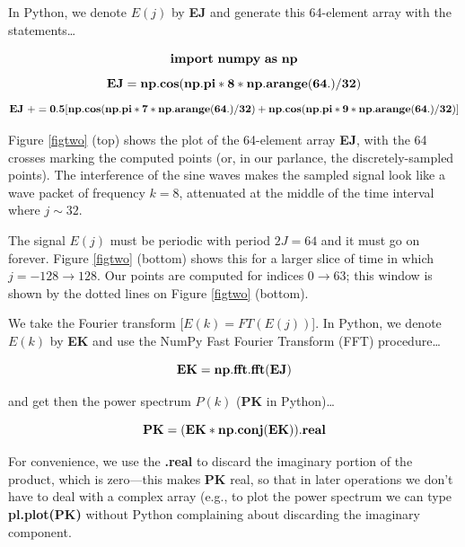\documentclass[11pt,preprint]{aastex}
\begin{document}
 In Python, we denote $E(j)$ by {\bf EJ} and generate this
64-element array with the statements\dots

\begin{mathletters} \begin{equation} \bf{ import~numpy~as~np} \end{equation}
 \begin{equation}
 \bf{ EJ = np.cos(np.pi * 8 * np.arange(64.)/32) }
\end{equation} \begin{equation} \bf{ EJ~+= 0.5[np.cos(np.pi * 7
* np.arange(64.)/32) + np.cos(np.pi * 9 * np.arange(64.)/32) ] }
\end{equation}
\end{mathletters}

\noindent Figure \ref{figtwo} (top) shows the plot of the 64-element
array {\bf EJ}, with the 64 crosses marking the computed points (or, in
our parlance, the discretely-sampled points).  The interference of the
sine waves makes the sampled signal look like a wave packet of frequency
$k=8$, attenuated at the middle of the time interval where $j \sim 32$. 

	The signal $E(j)$ must be periodic with period $2J = 64$ and it
must go on forever.  Figure \ref{figtwo} (bottom) shows this for a
larger slice of time in which $j = -128 \rightarrow 128$.  Our points
are computed for indices $0 \rightarrow 63$; this window is shown by
the dotted lines on Figure \ref{figtwo} (bottom). 

 We take the Fourier transform [$E(k) = FT( E(j))$].  In Python, we
denote $E(k)$ by {\bf EK} and use the NumPy Fast Fourier Transform (FFT)
procedure\dots

\begin{mathletters}
\begin{equation}
{\bf EK = np.fft.fft(EJ)}
\end{equation}

\noindent and get then the power spectrum $P(k)$ ({\bf PK} in Python)\dots

\begin{equation}
{\bf PK = (EK * np.conj(EK)).real}
\end{equation}
\end{mathletters}

\noindent For convenience, we use the {\bf .real} to discard the
imaginary portion of the product, which is zero---this makes {\bf PK}
real, so that in later operations we don't have to deal with a complex
array (e.g., to plot the power spectrum we can type {\bf pl.plot(PK)} without 
Python complaining about discarding the imaginary component.
\end{document}
